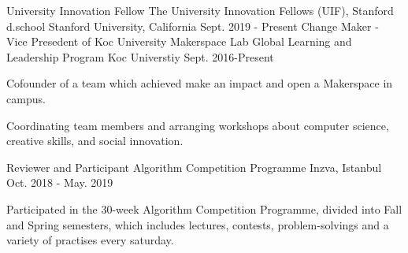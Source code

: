 

\begin{cventries}
  \cventry
    {University Innovation Fellow} %
    {The University Innovation Fellows (UIF), Stanford d.school } %
    {Stanford University, California} %
    {Sept. 2019 - Present} %
    {
    }
    \vspace{-4mm}
  \cventry
    {Change Maker - Vice Presedent of Koc University Makerspace Lab} %
    {Global Learning and Leadership Program} %
    {Koc Universtiy} %
    {Sept. 2016-Present} %
    {
      \begin{cvitems} %
        \item {Cofounder of a team which achieved make an impact and open a Makerspace in campus.}
        \item {Coordinating team members and arranging workshops about computer science, creative skills, and social innovation. }
      \end{cvitems}
    }
\vspace{-0.5mm}
  \cventry
    {Reviewer and Participant} %
    {Algorithm Competition Programme} %
    {Inzva, Istanbul} %
    {Oct. 2018 - May. 2019} %
    {
      \begin{cvitems} %
        \item {Participated in the 30-week Algorithm Competition Programme, divided into Fall and Spring semesters, which includes lectures, contests, problem-solvings and a variety of practises every saturday.}
      \end{cvitems}
}
\end{cventries}
